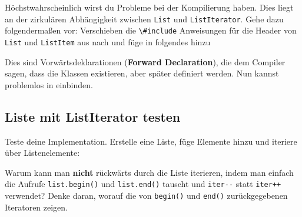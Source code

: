 

Höchstwahrscheinlich wirst du Probleme bei der Kompilierung haben.
Dies liegt an der zirkulären Abhängigkeit zwischen \lstinline{List} und \lstinline{ListIterator}.
Gehe dazu folgendermaßen vor:
Verschieben die \lstinline{\#include} Anweisungen für die Header von \lstinline{List} und \lstinline{ListItem} aus  nach  und füge in  folgendes hinzu



Dies sind Vorwärtsdeklarationen (\textbf{Forward Declaration}), die dem Compiler sagen, dass die Klassen existieren, aber später definiert werden. Nun kannst problemlos  in  einbinden.

\subsection{Liste mit ListIterator testen}
Teste deine Implementation.
Erstelle eine Liste, füge Elemente hinzu und iteriere über Listenelemente:



Warum kann man \textbf{nicht} rückwärts durch die Liste iterieren, indem man einfach die Aufrufe \lstinline{list.begin()} und \lstinline{list.end()} tauscht und \lstinline{iter--} statt \lstinline{iter++} verwendet?
Denke daran, worauf die von \lstinline{begin()} und \lstinline{end()} zurückgegebenen Iteratoren zeigen.

